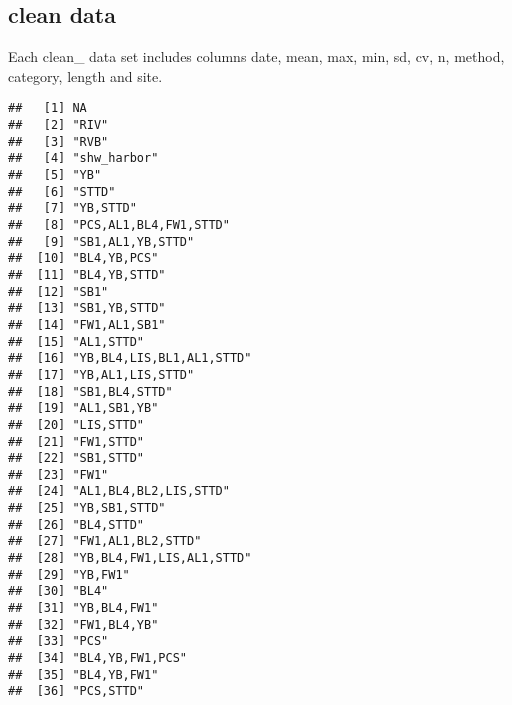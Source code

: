 \documentclass[
]{article}
\begin{document}
\hypertarget{clean-data}{%
\subsection{clean data}\label{clean-data}}

Each clean\_ data set includes columns date, mean, max, min, sd, cv, n,
method, category, length and site.

\begin{verbatim}
##   [1] NA                                                
##   [2] "RIV"                                             
##   [3] "RVB"                                             
##   [4] "shw_harbor"                                      
##   [5] "YB"                                              
##   [6] "STTD"                                            
##   [7] "YB,STTD"                                         
##   [8] "PCS,AL1,BL4,FW1,STTD"                            
##   [9] "SB1,AL1,YB,STTD"                                 
##  [10] "BL4,YB,PCS"                                      
##  [11] "BL4,YB,STTD"                                     
##  [12] "SB1"                                             
##  [13] "SB1,YB,STTD"                                     
##  [14] "FW1,AL1,SB1"                                     
##  [15] "AL1,STTD"                                        
##  [16] "YB,BL4,LIS,BL1,AL1,STTD"                         
##  [17] "YB,AL1,LIS,STTD"                                 
##  [18] "SB1,BL4,STTD"                                    
##  [19] "AL1,SB1,YB"                                      
##  [20] "LIS,STTD"                                        
##  [21] "FW1,STTD"                                        
##  [22] "SB1,STTD"                                        
##  [23] "FW1"                                             
##  [24] "AL1,BL4,BL2,LIS,STTD"                            
##  [25] "YB,SB1,STTD"                                     
##  [26] "BL4,STTD"                                        
##  [27] "FW1,AL1,BL2,STTD"                                
##  [28] "YB,BL4,FW1,LIS,AL1,STTD"                         
##  [29] "YB,FW1"                                          
##  [30] "BL4"                                             
##  [31] "YB,BL4,FW1"                                      
##  [32] "FW1,BL4,YB"                                      
##  [33] "PCS"                                             
##  [34] "BL4,YB,FW1,PCS"                                  
##  [35] "BL4,YB,FW1"                                      
##  [36] "PCS,STTD"                                        

\end{verbatim}
\end{document}
